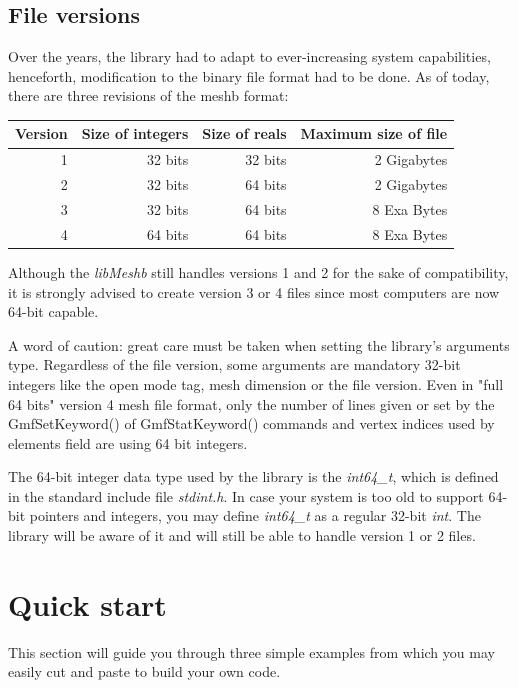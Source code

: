 \documentclass[a4paper,12pt]{article}
\begin{document}
\subsection{File versions}
Over the years, the library had to adapt to ever-increasing system capabilities, henceforth, modification to the binary file format had to be done. As of today, there are three revisions of the meshb format:
\medskip

\begin{tabular}{|r|r|r|r|}
\hline
Version & Size of integers & Size of reals & Maximum size of file \\
\hline
1 & 32 bits & 32 bits & 2 Gigabytes \\
\hline
2 & 32 bits & 64 bits & 2 Gigabytes \\
\hline
3 & 32 bits & 64 bits & 8 Exa Bytes \\
\hline
4 & 64 bits & 64 bits & 8 Exa Bytes \\
\hline
\end{tabular}
\medskip

Although the \emph{libMeshb} still handles versions 1 and 2 for the sake of compatibility, it is strongly advised to create version 3 or 4 files since most computers are now 64-bit capable.

A word of caution: great care must be taken when setting the library's arguments type. Regardless of the file version, some arguments are mandatory 32-bit integers like the open mode tag, mesh dimension or the file version. Even in "full 64 bits" version 4 mesh file format, only the number of lines given or set by the GmfSetKeyword() of GmfStatKeyword() commands and vertex indices used by elements field are using 64 bit integers.

The 64-bit integer data type used by the library is the \emph{int64\_t}, which is defined in the standard include file \emph{stdint.h}. In case your system is too old to support 64-bit pointers and integers, you may define \emph{int64\_t} as a regular 32-bit \emph{int}. The library will be aware of it and will still be able to handle version 1 or 2 files.


%
%

\section{Quick start}

This section will guide you through three simple examples from which you may easily cut and paste to build your own code.
\end{document}
